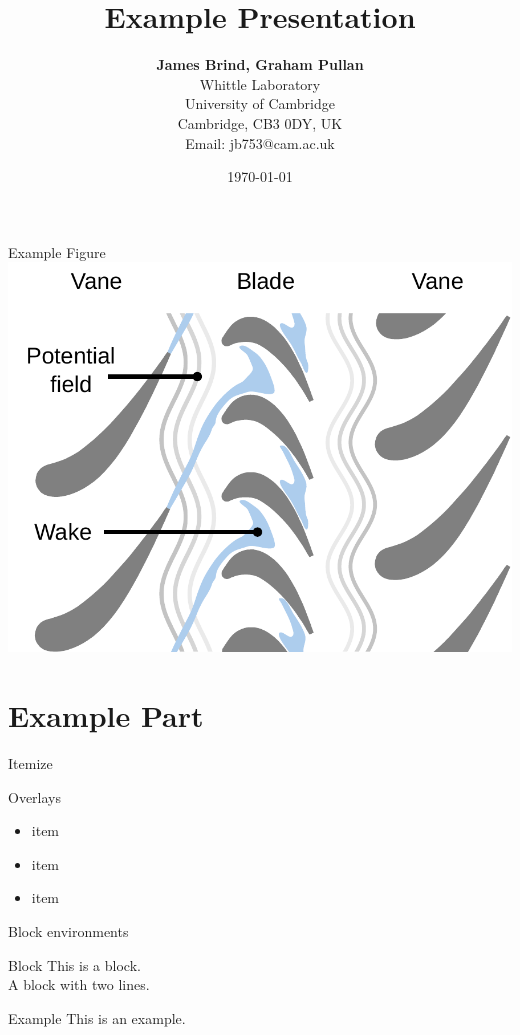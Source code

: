 \documentclass[unknownkeysallowed]{beamer}
\title{Example Presentation}
\author{\normalsize\textbf{James Brind, Graham Pullan} \\ 
Whittle Laboratory \\
University of Cambridge \\
Cambridge, CB3 0DY, UK \\
Email: jb753@cam.ac.uk}
\date{\normalsize\today}
\begin{document}
\begin{frame}
  \titlepage
\end{frame}

\begin{frame}{Example Figure}
  \centering
  \includegraphics[width=0.9\linewidth,trim={0 1.5cm 0 0},clip]{figures/blade_row_interactions.pdf}
\end{frame}

\part{Example Part}
\frame{\partpage}

\begin{frame}{Itemize}
\end{frame}

\begin{frame}{Overlays}
  \begin{itemize}
    \item<1,4> item
    \item<2,4> item
    \item<3,4> item
  \end{itemize}
\end{frame}

\begin{frame}{Block environments}
  \begin{block}{Block}
    This is a block.\\
    A block with two lines.
  \end{block}
  \begin{exampleblock}{Example}
    This is an example.
  \end{exampleblock}

\end{frame}
\end{document}
